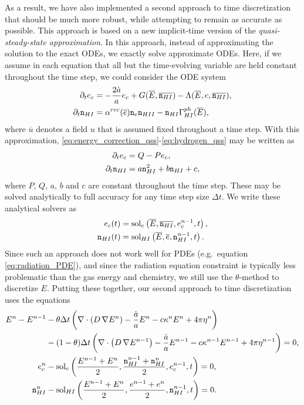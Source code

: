 \documentclass[letterpaper,10pt]{article}
\renewcommand{\(}{\left(}
\renewcommand{\)}{\right)}
\newcommand{\dt}{\Delta t}
\newcommand{\mn}{{\tt n}}
\begin{document}
As a result, we have also implemented a second approach to time
discretization that should be much more robust, while attempting to
remain as accurate as possible.  This approach is based on a new
implicit-time version of the {\em quasi-steady-state approximation}.
In this approach, instead of approximating the solution to the exact
ODEs, we exactly solve approximate ODEs.  Here, if we assume in each
equation that all but the time-evolving variable are held constant
throughout the time step, we could consider the ODE system
\begin{align}
  \label{eq:energy_correction_qss}
  \partial_t e_c &= -\frac{2\dot{a}}{a}e_c + G(\overline{E},\overline{\mn_{HI}}) - \Lambda(\overline{E},e,\overline{\mn_{HI}}), \\
  \label{eq:hydrogen_qss}
  \partial_t \mn_{HI} &= \alpha^{rec}(\overline{e}) \mn_e \mn_{HII} - \mn_{HI} \Gamma_{HI}^{ph}(\overline{E}),
\end{align}
where $\overline{u}$ denotes a field $u$ that is assumed fixed
throughout a time step.  With this approximation,
\eqref{eq:energy_correction_qss}-\eqref{eq:hydrogen_qss} may be
written as
\begin{align}
  \label{eq:energy_correction_qss2}
  \partial_t e_c &= Q - Pe_c, \\
  \label{eq:hydrogen_qss2}
  \partial_t \mn_{HI} &= a \mn_{HI}^2 + b\mn_{HI} + c,
\end{align}
where $P$, $Q$, $a$, $b$ and $c$ are constant throughout the time
step.  These may be solved analytically to full accuracy for any time
step size $\dt$.  We write these analytical solvers as
\begin{align}
  \label{eq:energy_correction_qss3}
  e_c(t) &= \text{sol}_e\left(\overline{E},\overline{\mn_{HI}},e_c^{n-1},t\right), \\
  \label{eq:hydrogen_qss3}
  \mn_{HI}(t) &= \text{sol}_{HI}\left(\overline{E},\overline{e},\mn_{HI}^{n-1},t\right).
\end{align}
Since such an approach does not work well for PDEs (e.g.~equation
\eqref{eq:radiation_PDE}), and since the radiation equation constraint
is typically less problematic than the gas energy and chemistry, we
still use the $\theta$-method to discretize $E$.  Putting these
together, our second approach to time discretization uses the
equations 
\begin{align}
  \label{eq:radiation_PDE_iqss}
  E^n - E^{n-1} &- \theta\dt\left(\nabla\cdot\(D\,\nabla E^n\) - \frac{\dot{a}}{a} E^n -
    c\kappa^n E^n + 4\pi\eta^n\right) \\ 
  \notag
  & - (1-\theta)\dt\left(\nabla\cdot\(D\,\nabla E^{n-1}\) - \frac{\dot{a}}{a} E^{n-1} -
    c\kappa^{n-1} E^{n-1} + 4\pi\eta^{n-1}\right) = 0, \\ 
  \label{eq:energy_correction_iqss}
  e_c^n &- \text{sol}_e\left(\frac{E^{n-1}+E^n}{2},\frac{\mn_{HI}^{n-1}+\mn_{HI}^n}{2},e_c^{n-1},t\right) = 0, \\
  \label{eq:hydrogen_iqss}
  \mn_{HI}^n &- \text{sol}_{HI}\left(\frac{E^{n-1}+E^n}{2},\frac{e^{n-1}+e^n}{2},\mn_{HI}^{n-1},t\right) = 0.
\end{align}
\end{document}
